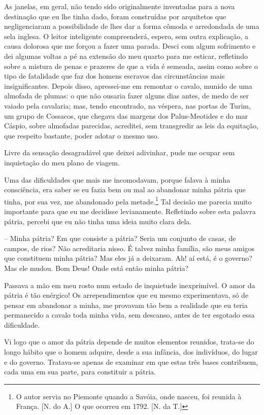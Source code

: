  As janelas, em geral, não tendo sido originalmente inventadas para a
nova destinação que eu lhe tinha dado, foram construídas por arquitetos
que negligenciaram a possibilidade de lhes dar a forma cômoda e
arredondada de uma sela inglesa. O leitor inteligente compreenderá,
espero, sem outra explicação, a causa dolorosa que me forçou a fazer
uma parada. Desci com algum sofrimento e dei algumas voltas a pé na
extensão do meu quarto para me esticar, refletindo sobre a mistura de
penas e prazeres de que a vida é semeada, assim como sobre o tipo de
fatalidade que faz dos homens escravos das circunstâncias mais
insignificantes. Depois disso, apressei-me em remontar o cavalo, munido
de uma almofada de plumas: o que não ousaria fazer alguns dias antes,
de medo de ser vaiado pela cavalaria; mas, tendo encontrado, na
véspera, nas portas de Turim, um grupo de Cossacos, que chegava das
margens dos Palus-Meotides e do mar Cáspio, sobre almofadas parecidas,
acreditei, sem transgredir as leis da equitação, que respeito bastante,
poder adotar o mesmo uso.

 Livre da sensação desagradável que deixei adivinhar, pude me ocupar sem
inquietação do meu plano de viagem.

 Uma das dificuldades que mais me incomodavam, porque falava à minha
consciência, era saber se eu fazia bem ou mal ao abandonar minha pátria
que tinha, por sua vez, me abandonado pela metade.\footnote{ O autor
servia no Piemonte quando a Savóia, onde nasceu, foi reunida à França.
[N. do A.] O que ocorreu em 1792. [N. da T.]} Tal decisão me parecia muito
importante para que eu me decidisse levianamente. Refletindo sobre esta
palavra pátria, percebi que eu não tinha uma ideia muito clara dela. 

-- Minha pátria? Em que consiste a pátria? Seria um conjunto de casas,
de campos, de rios? Não acreditaria nisso. É talvez minha família, são
meus amigos que constituem minha pátria? Mas eles já a deixaram. Ah! aí
está, é o governo? Mas ele mudou. Bom Deus! Onde está então minha
pátria?

 Passava a mão em meu rosto num estado de inquietude inexprimível. O
amor da pátria é tão enérgico! Os arrependimentos que eu mesmo
experimentava, só de pensar em abandonar a minha, me provavam tão bem a
realidade que eu teria permanecido a cavalo toda minha vida, sem
descanso, antes de ter esgotado essa dificuldade.

 Vi logo que o amor da pátria depende de muitos elementos reunidos,
trata-se do longo hábito que o homem adquire, desde a sua infância, dos
indivíduos, do lugar e do governo. Tratava-se apenas de examinar em que
estas três bases contribuem, cada uma em sua parte, para constituir a
pátria.

